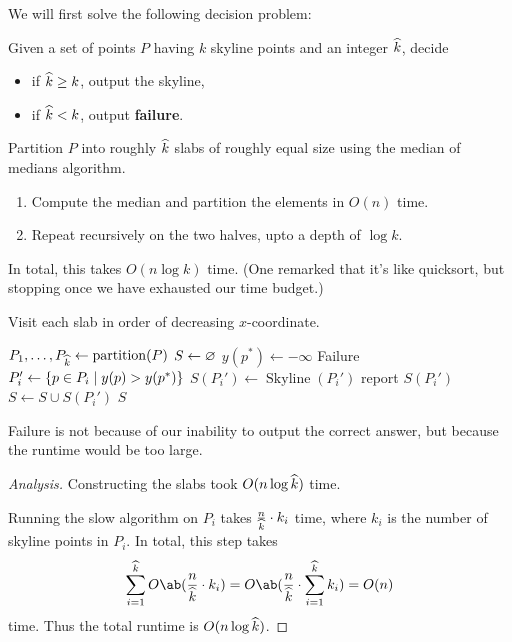 We will first solve the following decision problem:
\begin{question*}
    Given a set of points $P$ having $k$ skyline points and an integer
    $\widehat{k}$, decide
    \begin{itemize}
        \item if $\widehat{k} \ge k$, output the skyline,
        \item if $\widehat{k} < k$, output \textbf{failure}.
    \end{itemize}
\end{question*}
\begin{solution}
    Partition $P$ into roughly $\widehat{k}$ slabs of roughly equal size
    using the median of medians algorithm.
    \begin{enumerate}
        \item Compute the median and partition the elements in $O(n)$ time.
        \item Repeat recursively on the two halves, upto a depth of
            $\log k$.
    \end{enumerate}
    In total, this takes $O(n \log k)$ time.
    (One remarked that it's like quicksort, but stopping once we have
    exhausted our time budget.)

    Visit each slab in order of decreasing $x$-coordinate.
    \begin{algo}
            \State $P_1, \ldots, P_{\widehat{k}} \gets
                \operatorname{partition}(P)$
            \State $S \gets \varnothing$
            \State $y(p^*) \gets -\infty$
                    \State \Return Failure
                \Else
                    \State $P_i' \gets \{p \in P_i \mid y(p) > y(p^*)\}$
                    \State $S(P_i') \gets \operatorname{Skyline}(P_i')$
                    \State report $S(P_i')$
                    \State $S \gets S \cup S(P_i')$
                \EndIf
            \EndFor
            \State \Return $S$
        \EndFn
    \end{algo}
    Failure is not because of our inability to output the correct answer,
    but because the runtime would be too large.
\end{solution}
\begin{proof}[Analysis]
    Constructing the slabs took $O(n \log \widehat{k})$ time.

    Running the slow algorithm on $P_i$ takes $\frac{n}{\widehat{k}} \cdot k_i$
    time, where $k_i$ is the number of skyline points in $P_i$.
    In total, this step takes \[
        \sum_{i=1}^{\what{k}} O\ab(\frac{n}{\what{k}} \cdot k_i)
            = O\ab(\frac{n}{\what{k}} \cdot \sum_{i=1}^{\what{k}} k_i)
            = O(n)
    \] time.
    Thus the total runtime is $O(n \log \widehat{k})$.
\end{proof}

